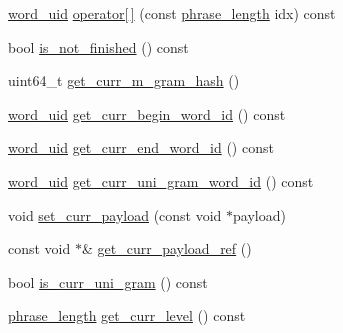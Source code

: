\begin{DoxyCompactItemize}
\item 
\hyperlink{namespaceuva_1_1smt_1_1bpbd_1_1server_a6bfe45ba344d65a7fdd7d26156328ddc}{word\+\_\+uid} \hyperlink{classuva_1_1smt_1_1bpbd_1_1server_1_1lm_1_1m__gram__query_a3c7e8ddc4d50c6eef77a240c685e2187}{operator\mbox{[}$\,$\mbox{]}} (const \hyperlink{namespaceuva_1_1smt_1_1bpbd_1_1server_af068a19c2e03116caf3e3827a3e40e35}{phrase\+\_\+length} idx) const 
\item 
bool \hyperlink{classuva_1_1smt_1_1bpbd_1_1server_1_1lm_1_1m__gram__query_ac1c3bb2d3c9d88c7f9537f9f9c95761a}{is\+\_\+not\+\_\+finished} () const 
\item 
uint64\+\_\+t \hyperlink{classuva_1_1smt_1_1bpbd_1_1server_1_1lm_1_1m__gram__query_ae47324b83db7af6f62222a719a5caaee}{get\+\_\+curr\+\_\+m\+\_\+gram\+\_\+hash} ()
\item 
\hyperlink{namespaceuva_1_1smt_1_1bpbd_1_1server_a6bfe45ba344d65a7fdd7d26156328ddc}{word\+\_\+uid} \hyperlink{classuva_1_1smt_1_1bpbd_1_1server_1_1lm_1_1m__gram__query_aef95dda38cc09ce62fe22fdad30aeac2}{get\+\_\+curr\+\_\+begin\+\_\+word\+\_\+id} () const 
\item 
\hyperlink{namespaceuva_1_1smt_1_1bpbd_1_1server_a6bfe45ba344d65a7fdd7d26156328ddc}{word\+\_\+uid} \hyperlink{classuva_1_1smt_1_1bpbd_1_1server_1_1lm_1_1m__gram__query_aa7dfb58ebdf4c0359fb7a40e73332414}{get\+\_\+curr\+\_\+end\+\_\+word\+\_\+id} () const 
\item 
\hyperlink{namespaceuva_1_1smt_1_1bpbd_1_1server_a6bfe45ba344d65a7fdd7d26156328ddc}{word\+\_\+uid} \hyperlink{classuva_1_1smt_1_1bpbd_1_1server_1_1lm_1_1m__gram__query_ad60f05d373b54bec04021af6622f58a4}{get\+\_\+curr\+\_\+uni\+\_\+gram\+\_\+word\+\_\+id} () const 
\item 
void \hyperlink{classuva_1_1smt_1_1bpbd_1_1server_1_1lm_1_1m__gram__query_ab3f07b41212094bcd91fb3a76dadc78d}{set\+\_\+curr\+\_\+payload} (const void $\ast$payload)
\item 
const void $\ast$\& \hyperlink{classuva_1_1smt_1_1bpbd_1_1server_1_1lm_1_1m__gram__query_a0994240ff14e9097b141229b1f5a7c2c}{get\+\_\+curr\+\_\+payload\+\_\+ref} ()
\item 
bool \hyperlink{classuva_1_1smt_1_1bpbd_1_1server_1_1lm_1_1m__gram__query_a8eb2db1bed9926b14bde0dd0cd1ddba2}{is\+\_\+curr\+\_\+uni\+\_\+gram} () const 
\item 
\hyperlink{namespaceuva_1_1smt_1_1bpbd_1_1server_af068a19c2e03116caf3e3827a3e40e35}{phrase\+\_\+length} \hyperlink{classuva_1_1smt_1_1bpbd_1_1server_1_1lm_1_1m__gram__query_ad364c5d36e2f5499817428590ffda074}{get\+\_\+curr\+\_\+level} () const 

\end{DoxyCompactItemize}
